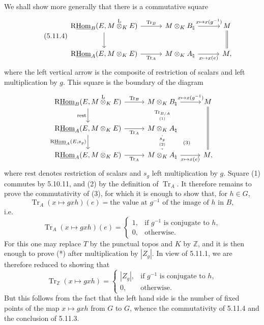 \documentclass[11pt]{article}
\providecommand{\Tr}{\operatorname{Tr}}
\providecommand{\Tr}{\operatorname{Tr}}
\providecommand{\lten}{\overset{\mathrm L}{\otimes}}
\providecommand{\Tr}{\operatorname{Tr}}
\providecommand{\lten}{\overset{\mathrm L}{\otimes}}
\providecommand{\lten}{\overset{\mathrm L}{\otimes}}
\providecommand{\Tr}{\operatorname{Tr}}
\providecommand{\lten}{\overset{\mathrm L}{\otimes}}
\providecommand{\lten}{\overset{\mathrm L}{\otimes}}
\providecommand{\lten}{\overset{\mathrm L}{\otimes}}
\providecommand{\Tr}{\operatorname{Tr}}
\providecommand{\lten}{\overset{\mathrm L}{\otimes}}
\begin{document}
We shall show more generally that there is a commutative square
\begin{equation}\tag{5.11.4}
\begin{tikzcd}[column sep=3.0em,row sep=2.2em]
\mathrm{R}\underline{\mathrm{Hom}}_B(E,M\lten_KE) \arrow[r,"\Tr_B"] \arrow[d] &
M\otimes_KB_\natural \arrow[r,"{x\mapsto x(g^{-1})}"] &
M \arrow[d,equal] \\
\mathrm{R}\underline{\mathrm{Hom}}_A(E,M\otimes_KE) \arrow[r,"\Tr_A"'] &
M\otimes_KA_\natural \arrow[r,"{x\mapsto x(e)}"'] &
M,
\end{tikzcd}
\end{equation}
where the left vertical arrow is the composite of restriction of scalars and left multiplication by $g$. This square is the boundary of the diagram
\[
\begin{tikzcd}[column sep=2.8em,row sep=2.0em]
\mathrm{R}\underline{\mathrm{Hom}}_B(E,M\lten_KE) \arrow[r,"\Tr_B"] \arrow[d,"\mathrm{rest}"'] &
M\otimes_KB_\natural \arrow[r,"{x\mapsto x(g^{-1})}"] \arrow[d,"{\underset{(1)}{\Tr_{B/A}}}" description] &
M \arrow[dd,equal] \\
\mathrm{R}\underline{\mathrm{Hom}}_A(E,M\otimes_KE) \arrow[r,"\Tr_A"'] \arrow[d,"{\mathrm{R}\underline{\mathrm{Hom}}_A(E,s_g)}"'] &
M\otimes_KA_\natural \arrow[d,"{\underset{(2)}{s_g}}" description] \arrow[dr,phantom,"\scriptstyle(3)" description] &
\\
\mathrm{R}\underline{\mathrm{Hom}}_A(E,M\otimes_KE) \arrow[r,"\Tr_A"'] &
M\otimes_KA_\natural \arrow[r,"{x\mapsto x(e)}"'] &
M,
\end{tikzcd}
\]
where $\mathrm{rest}$ denotes restriction of scalars and $s_g$ left multiplication by $g$. Square (1) commutes by 5.10.11, and (2) by the definition of $\Tr_A$. It therefore remains to prove the commutativity of (3), for which it is enough to show that, for $h\in G$,
\[
\Tr_A(x\mapsto gxh)(e)=\text{the value at }g^{-1}\text{ of the image of }h\text{ in }B,
\]
i.e.
\begin{equation}\tag{*}
\Tr_A(x\mapsto gxh)(e)=
\begin{cases}
1,& \text{if }g^{-1}\text{ is conjugate to }h,\\
0,& \text{otherwise}.
\end{cases}
\end{equation}
For this one may replace $T$ by the punctual topos and $K$ by $\mathbb Z$, and it is then enough to prove (*) after multiplication by $|Z_g|$. In view of 5.11.1, we are therefore reduced to showing that
\[
\Tr_{\mathbb Z}(x\mapsto gxh)=
\begin{cases}
|Z_g|,& \text{if }g^{-1}\text{ is conjugate to }h,\\
0,& \text{otherwise}.
\end{cases}
\]
But this follows from the fact that the left hand side is the number of fixed points of the map $x\mapsto gxh$ from $G$ to $G$, whence the commutativity of 5.11.4 and the conclusion of 5.11.3.
\end{document}
